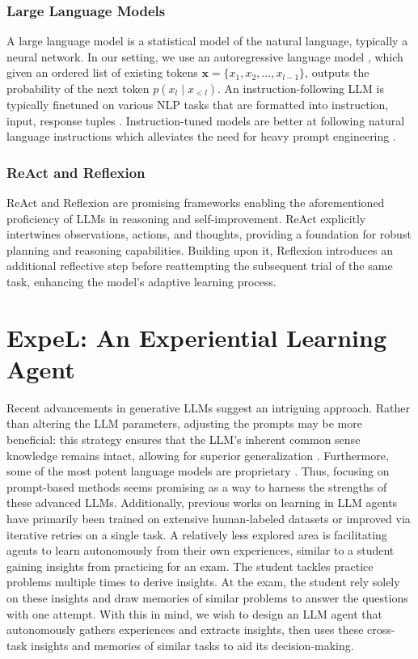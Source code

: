 \documentclass[letterpaper]{article} %
\begin{document}
\subsubsection{Large Language Models}
A large language model is a statistical model of the natural language, typically a neural network. In our setting, we use an autoregressive language model \cite{openai2023gpt4,brown2020language,touvron2023llama2,touvron2023llama,chowdhery2022palm}, which given an ordered list of existing tokens $\mathbf{x}=\{x_1,x_2,...,x_{l-1}\}$, outputs the probability of the next token $p(x_l\mid x_{<l})$. An instruction-following LLM \cite{thoppilan2022lamda,chung2022scaling,wei2021finetuned} is typically finetuned on various NLP tasks that are formatted into instruction, input, response tuples \cite{alpaca}. Instruction-tuned models are better at following natural language instructions which alleviates the need for heavy prompt engineering \cite{wei2021finetuned}.

\subsubsection{ReAct and Reflexion}
ReAct \cite{yao2022react} and Reflexion \cite{shinn2023reflexion} are promising frameworks enabling the aforementioned proficiency of LLMs in reasoning and self-improvement. ReAct explicitly intertwines observations, actions, and thoughts, providing a foundation for robust planning and reasoning capabilities. Building upon it, Reflexion introduces an additional reflective step before reattempting the subsequent trial of the same task, enhancing the model's adaptive learning process.

\section{ExpeL: An Experiential Learning Agent}
Recent advancements in generative LLMs suggest an intriguing approach. Rather than altering the LLM parameters, adjusting the prompts may be more beneficial: this strategy ensures that the LLM's inherent common sense knowledge remains intact, allowing for superior generalization \cite{liu2023pre}. Furthermore, some of the most potent language models are proprietary \cite{openai2023gpt4,anthropic2023}. Thus, focusing on prompt-based methods seems promising as a way to harness the strengths of these advanced LLMs. Additionally, previous works on learning in LLM agents have primarily been trained on extensive human-labeled datasets \cite{lin2023swiftsage,shaw2023pixels} or improved via iterative retries \cite{shinn2023reflexion} on a single task. A relatively less explored area is facilitating agents to learn autonomously from their own experiences, similar to a student gaining insights from practicing for an exam. The student tackles practice problems multiple times to derive insights. At the exam, the student rely solely on these insights and draw memories of similar problems to answer the questions with one attempt. With this in mind, we wish to design an LLM agent that autonomously gathers experiences and extracts insights, then uses these cross-task insights and memories of similar tasks to aid its decision-making.
\end{document}

